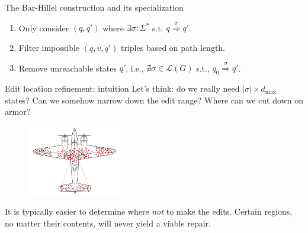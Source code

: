 \documentclass{beamer}
\begin{document}
\begin{frame}[t,fragile]{The Bar-Hillel construction and its specialization}
\begin{onlyenv}
  \begin{enumerate}
    \item Only consider $(q, q')$ where $\exists \sigma: \Sigma^*$ s.t. $q \overset{\sigma}{\Longrightarrow} q'$.
    \item Filter impossible $(q, v, q')$ triples based on path length.
    \item Remove unreachable states $q'$, i.e., $\nexists \sigma \in \mathcal{L}(G)$ s.t., $q_0 \overset{\sigma}{\Longrightarrow} q'$.
  \end{enumerate}
  \end{onlyenv}
\end{frame}

\begin{frame}[fragile]{Edit location refinement: intuition}
  Let's think: do we really need $|\sigma| \times d_\max$ states? Can we somehow narrow down the edit range? Where can we cut down on armor?

  \begin{figure}[H]
  \includegraphics[width=0.37\textwidth]{../figures/survivorship}
  \end{figure}

  It is typically easier to determine where \textit{not} to make the edits. Certain regions, no matter their contents, will never yield a viable repair.
\end{frame}
\end{document}
